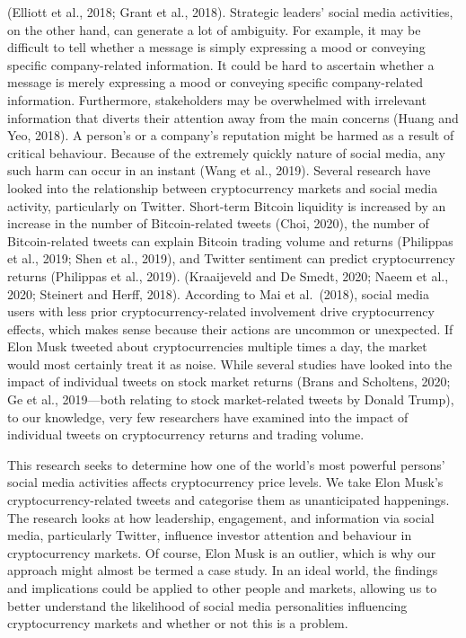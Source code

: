 \documentclass[
]{article}
\begin{document}
(Elliott et al., 2018; Grant et al., 2018). Strategic leaders' social
media activities, on the other hand, can generate a lot of ambiguity.
For example, it may be difficult to tell whether a message is simply
expressing a mood or conveying specific company-related information. It
could be hard to ascertain whether a message is merely expressing a mood
or conveying specific company-related information. Furthermore,
stakeholders may be overwhelmed with irrelevant information that diverts
their attention away from the main concerns (Huang and Yeo, 2018). A
person's or a company's reputation might be harmed as a result of
critical behaviour. Because of the extremely quickly nature of social
media, any such harm can occur in an instant (Wang et al., 2019).
Several research have looked into the relationship between
cryptocurrency markets and social media activity, particularly on
Twitter. Short-term Bitcoin liquidity is increased by an increase in the
number of Bitcoin-related tweets (Choi, 2020), the number of
Bitcoin-related tweets can explain Bitcoin trading volume and returns
(Philippas et al., 2019; Shen et al., 2019), and Twitter sentiment can
predict cryptocurrency returns (Philippas et al., 2019). (Kraaijeveld
and De Smedt, 2020; Naeem et al., 2020; Steinert and Herff, 2018).
According to Mai et al.~(2018), social media users with less prior
cryptocurrency-related involvement drive cryptocurrency effects, which
makes sense because their actions are uncommon or unexpected. If Elon
Musk tweeted about cryptocurrencies multiple times a day, the market
would most certainly treat it as noise. While several studies have
looked into the impact of individual tweets on stock market returns
(Brans and Scholtens, 2020; Ge et al., 2019---both relating to stock
market-related tweets by Donald Trump), to our knowledge, very few
researchers have examined into the impact of individual tweets on
cryptocurrency returns and trading volume.

This research seeks to determine how one of the world's most powerful
persons' social media activities affects cryptocurrency price levels. We
take Elon Musk's cryptocurrency-related tweets and categorise them as
unanticipated happenings. The research looks at how leadership,
engagement, and information via social media, particularly Twitter,
influence investor attention and behaviour in cryptocurrency markets. Of
course, Elon Musk is an outlier, which is why our approach might almost
be termed a case study. In an ideal world, the findings and implications
could be applied to other people and markets, allowing us to better
understand the likelihood of social media personalities influencing
cryptocurrency markets and whether or not this is a problem.
\end{document}
